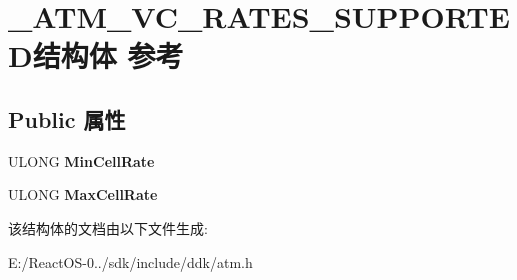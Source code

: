 \hypertarget{struct___a_t_m___v_c___r_a_t_e_s___s_u_p_p_o_r_t_e_d}{}\section{\+\_\+\+A\+T\+M\+\_\+\+V\+C\+\_\+\+R\+A\+T\+E\+S\+\_\+\+S\+U\+P\+P\+O\+R\+T\+E\+D结构体 参考}
\label{struct___a_t_m___v_c___r_a_t_e_s___s_u_p_p_o_r_t_e_d}
\subsection*{Public 属性}
\begin{DoxyCompactItemize}
\item 
\mbox{\label{struct___a_t_m___v_c___r_a_t_e_s___s_u_p_p_o_r_t_e_d_ade2245a0d9e43b84bfa08f6be15e4876}} 
U\+L\+O\+NG {\bfseries Min\+Cell\+Rate}
\item 
\mbox{\label{struct___a_t_m___v_c___r_a_t_e_s___s_u_p_p_o_r_t_e_d_a6556a9ca304eca3292fe07cfe65912d9}} 
U\+L\+O\+NG {\bfseries Max\+Cell\+Rate}
\end{DoxyCompactItemize}


该结构体的文档由以下文件生成\+:\begin{DoxyCompactItemize}
\item 
E\+:/\+React\+O\+S-\/0../sdk/include/ddk/atm.\+h\end{DoxyCompactItemize}
